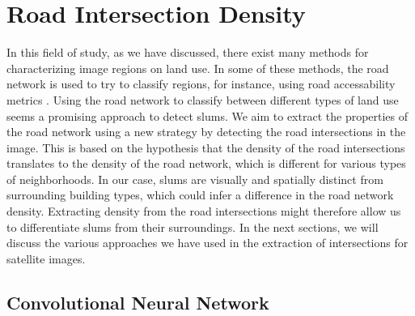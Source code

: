 \section{Road Intersection Density}

In this field of study, as we have discussed, there exist many methods for characterizing image regions on land use. In some of these methods, the road network is used to try to classify regions, for instance, using road accessability metrics \cite{owen2013approach}. Using the road network to classify between different types of land use seems a promising approach to detect slums. We aim to extract the properties of the road network using a new strategy by detecting the road intersections in the image. This is based on the hypothesis that the density of the road intersections translates to the density of the road network, which is different for various types of neighborhoods. In our case, slums are visually and spatially distinct from surrounding building types, which could infer a difference in the road network density. Extracting density from the road intersections might therefore allow us to differentiate slums from their surroundings. In the next sections, we will discuss the various approaches we have used in the extraction of intersections for satellite images.



\subsection{Convolutional Neural Network}

